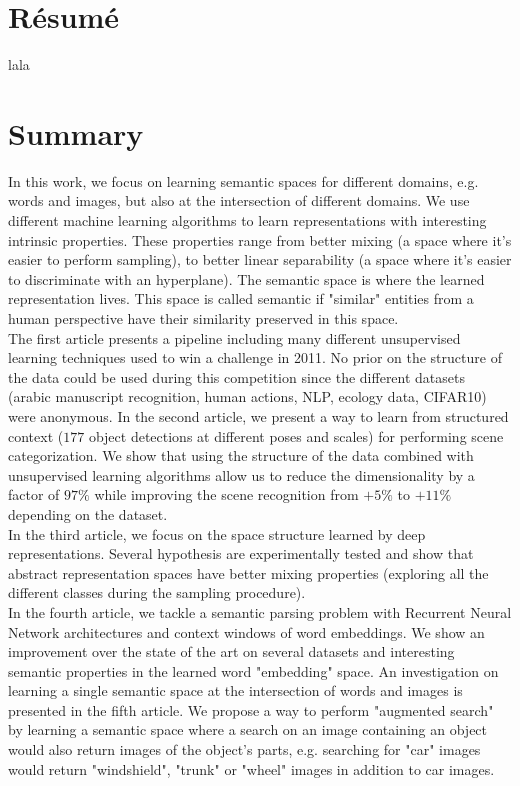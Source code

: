 \chapter*{R\'{e}sum\'{e}}

lala

\chapter*{Summary}

In this work, we focus on learning semantic spaces for different domains, e.g.
words and images, but also at the intersection of different domains. We use
different machine learning algorithms to learn representations with interesting
intrinsic properties. These properties range from better mixing (a space where
it's easier to perform sampling), to better linear separability (a space where
it's easier to discriminate with an hyperplane). The semantic space is where
the learned representation lives. This space is called semantic if "similar"
entities from a human perspective have their similarity preserved in this
space.\\

The first article presents a pipeline including many different unsupervised
learning techniques used to win a challenge in 2011. No prior on the structure
of the data could be used during this competition since the different datasets
(arabic manuscript recognition, human actions, NLP, ecology data, CIFAR10) were
anonymous. In the second article, we present a way to learn from structured
context ($177$ object detections at different poses and scales) for performing
scene categorization. We show that using the structure of the data combined
with unsupervised learning algorithms allow us to reduce the dimensionality by
a factor of $97\%$ while improving the scene recognition from $+5\%$ to $+11\%$
depending on the dataset.\\

In the third article, we focus on the space structure learned by deep
representations. Several hypothesis are experimentally tested and show that
abstract representation spaces have better mixing properties (exploring all the
different classes during the sampling procedure).\\

In the fourth article, we tackle a semantic parsing problem with Recurrent
Neural Network architectures and context windows of word embeddings. We show an
improvement over the state of the art on several datasets and interesting
semantic properties in the learned word "embedding" space.  An investigation on
learning a single semantic space at the intersection of words and images is
presented in the fifth article. We propose a way to perform "augmented search"
by learning a semantic space where a search on an image containing an object
would also return images of the object's parts, e.g. searching for "car" images
would return "windshield", "trunk" or "wheel" images in addition to car images.
